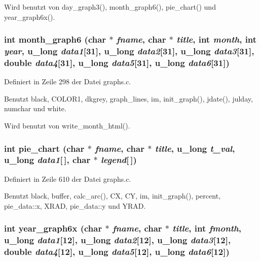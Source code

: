 Wird benutzt von day\_\-graph3(), month\_\-graph6(), pie\_\-chart() und year\_\-graph6x().
\subsubsection{\setlength{\rightskip}{0pt plus 5cm}int month\_\-graph6 (char $\ast$ {\em fname}, char $\ast$ {\em title}, int {\em month}, int {\em year}, u\_\-long {\em data1}[31], u\_\-long {\em data2}[31], u\_\-long {\em data3}[31], double {\em data4}[31], u\_\-long {\em data5}[31], u\_\-long {\em data6}[31])}\label{graphs_8c_7d33e4e14ae660bf05b5793f8e18d091}




Definiert in Zeile 298 der Datei graphs.c.

Benutzt black, COLOR1, dkgrey, graph\_\-lines, im, init\_\-graph(), jdate(), julday, numchar und white.

Wird benutzt von write\_\-month\_\-html().
\subsubsection{\setlength{\rightskip}{0pt plus 5cm}int pie\_\-chart (char $\ast$ {\em fname}, char $\ast$ {\em title}, u\_\-long {\em t\_\-val}, u\_\-long {\em data1}[$\,$], char $\ast$ {\em legend}[$\,$])}\label{graphs_8c_49e615d9104950eeb7a886df4301f7da}




Definiert in Zeile 610 der Datei graphs.c.

Benutzt black, buffer, calc\_\-arc(), CX, CY, im, init\_\-graph(), percent, pie\_\-data::x, XRAD, pie\_\-data::y und YRAD.
\subsubsection{\setlength{\rightskip}{0pt plus 5cm}int year\_\-graph6x (char $\ast$ {\em fname}, char $\ast$ {\em title}, int {\em fmonth}, u\_\-long {\em data1}[12], u\_\-long {\em data2}[12], u\_\-long {\em data3}[12], double {\em data4}[12], u\_\-long {\em data5}[12], u\_\-long {\em data6}[12])}\label{graphs_8c_58eec29feb4d1c90de8813c8c59d4fcd}




